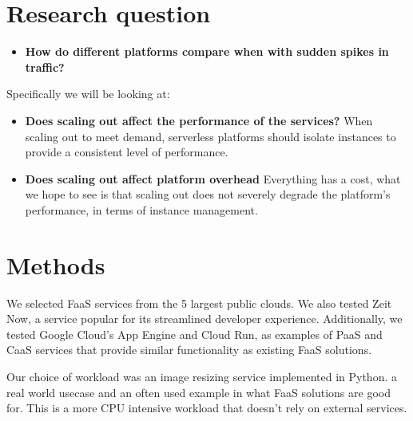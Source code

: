 \documentclass[11pt]{article}
\begin{document}

\section{Research question}
%
\begin{itemize}
\item \textbf{How do different platforms compare when with sudden spikes in traffic?}
\end{itemize}

Specifically we will be looking at:

\begin{itemize}

\item \textbf{Does scaling out affect the performance of the services?}
When scaling out to meet demand,
serverless platforms should isolate instances
to provide a consistent level of performance.

\item \textbf{Does scaling out affect platform overhead}
Everything has a cost,
what we hope to see is that scaling out does not severely degrade the platform's performance,
in terms of instance management.


\end{itemize}




\section{Methods}
\label{methods}

We selected FaaS services from the 5 largest public clouds. %
We also tested Zeit Now, a service popular for its streamlined developer experience.
Additionally, we tested Google Cloud's App Engine and Cloud Run,
as examples of PaaS and CaaS services that provide similar functionality as existing FaaS solutions.

Our choice of workload was an image resizing service implemented in Python.
a real world %
usecase and an often used example in what FaaS solutions are good for. %
This is a more CPU intensive workload that
doesn't rely on external services.
\end{document}
